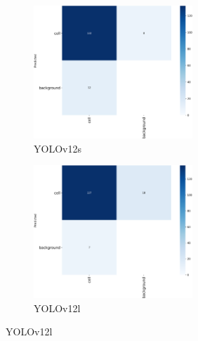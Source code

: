 \documentclass[12pt,a4paper,onecolumn,oneside]{report}
\begin{document}
\begin{figure}[H]
  \vspace{0.1cm}
  \begin{subfigure}[b]{0.45\textwidth}
    \centering
    \includegraphics[height=5cm]{figuras/resultados experimentacion/yolov12s/test2/confusion_matrix.png}
    \vspace{-0.3cm}
    \caption{\footnotesize YOLOv12s}
    \label{fig:confusion_yolov12s_test2}
  \end{subfigure}
  \hfill
  \begin{subfigure}[b]{0.45\textwidth}
    \centering
    \includegraphics[height=5cm]{figuras/resultados experimentacion/yolov12l/test2/confusion_matrix.png}
    \vspace{-0.3cm}
    \caption{\footnotesize YOLOv12l}
    \label{fig:confusion_yolov12l_test2}
  \end{subfigure}
  

\end{figure}
\end{document}
